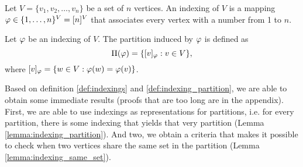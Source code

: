 \begin{definition}
    Let $V = \{ v_1,v_2,\dots, v_n \}$ be a set of $n$ vertices. An indexing of $V$ is a mapping $\varphi \in \{ 1,\dots,n \}^V = [n]^V$ that associates every vertex with a number from 1 to $n$. \label{def:indexings}
\end{definition}

\begin{definition}
    Let $\varphi$ be an indexing of $V$. The partition induced by $\varphi$ is defined as
    \begin{equation}
        \Pi(\varphi)= \{ [v]_\varphi : v \in V \}, \label{eq:indexing}
    \end{equation}
    where $[v]_\varphi = \{ w \in V : \varphi(w) = \varphi(v) \}$. \label{def:indexing_partition}
\end{definition}

Based on definition \ref{def:indexings} and \ref{def:indexing_partition}, we are able to obtain some immediate results (proofs that are too long are in the appendix). First, we are able to use indexings as representations for partitions, i.e. for every partition, there is some indexing that yields that very partition (Lemma \ref{lemma:indexing_partition}). And two, we obtain a criteria that makes it possible to check when two vertices share the same set in the partition (Lemma \ref{lemma:indexing_same_set}).  

